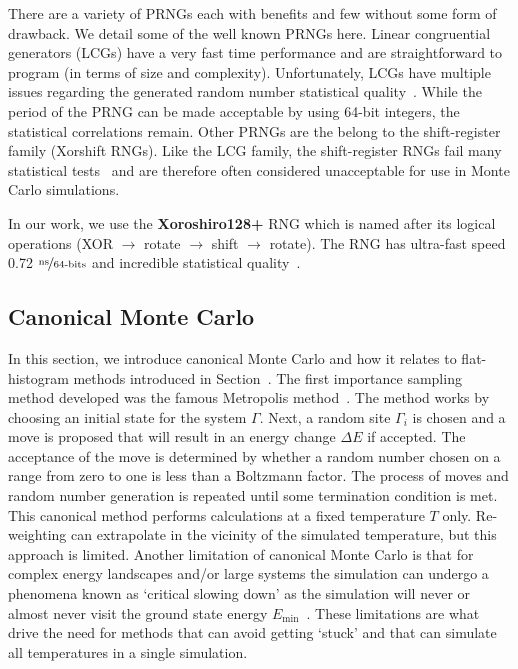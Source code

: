 There are a variety of PRNGs each with benefits and few without some form of drawback. We detail some of the well known PRNGs here. Linear congruential generators (LCGs) have a very fast time performance and are straightforward to program (in terms of size and complexity). Unfortunately, LCGs have multiple issues regarding the generated random number statistical quality~\cite{coddington1994analysis, barry1996recommendations}. While the period of the PRNG can be made acceptable by using 64-bit integers, the statistical correlations remain. Other PRNGs are the belong to the shift-register family (Xorshift RNGs). Like the LCG family, the shift-register RNGs fail many statistical tests~\cite{panneton2005xorshift} and are therefore often considered unacceptable for use in Monte Carlo simulations.

In our work, we use the \textbf{Xoroshiro128+} RNG which is named after its logical operations (XOR $\xrightarrow{}$ rotate $\xrightarrow{}$ shift $\xrightarrow{}$ rotate). The RNG has ultra-fast speed 0.72 $\nicefrac{\text{ns}}{\text{64-bits}}$ and incredible statistical quality~\cite{blackman2018scrambled}.

\subsection{Canonical Monte Carlo}\label{cmc}
In this section, we introduce canonical Monte Carlo and how it relates to flat-histogram methods introduced in Section~. The first importance sampling method developed was the famous Metropolis method~\cite{metropolis1953equation}.  The method works by choosing an initial state for the system $\Gamma$. Next, a random site $\Gamma_i$ is chosen and a move is proposed that will result in an energy change $\Delta E$ if accepted. The acceptance of the move is determined by whether a random number chosen on a range from zero to one is less than a Boltzmann factor. The process of moves and random number generation is repeated until some termination condition is met. This canonical method performs calculations at a fixed temperature $T$ only. Re-weighting can extrapolate in the vicinity of the simulated temperature, but this approach is limited. Another limitation of canonical Monte Carlo is that for complex energy landscapes and/or large systems the simulation can undergo a phenomena known as `critical slowing down' as the simulation will never or almost never visit the ground state energy $E_{\min}$~\cite{berg2000introduction}. These limitations are what drive the need for methods that can avoid getting `stuck' and that can simulate all temperatures in a single simulation.

